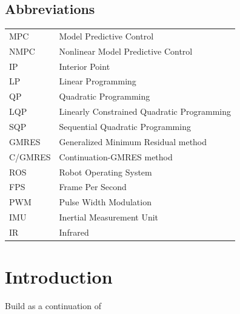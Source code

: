 \documentclass[a4paper, 12pt]{report}
\begin{document}
\subsection*{Abbreviations}
\begin{table}[h]
\centering
\begin{tabular}{p{8cm} p{8cm}}
MPC \dotfill & Model Predictive Control \\
NMPC \dotfill & Nonlinear Model Predictive Control \\
IP \dotfill & Interior Point \\
LP \dotfill & Linear Programming \\
QP \dotfill & Quadratic Programming \\
LQP \dotfill & Linearly Constrained Quadratic Programming \\
SQP \dotfill & Sequential Quadratic Programming \\
GMRES \dotfill & Generalized Minimum Residual method \\
C/GMRES \dotfill & Continuation-GMRES method \\
ROS \dotfill & Robot Operating System \\
FPS \dotfill	 & Frame Per Second \\
PWM \dotfill & Pulse Width Modulation \\
IMU \dotfill & Inertial Measurement Unit \\
IR \dotfill & Infrared \\
\end{tabular} 
\end{table}

\newpage
{}
\listoftables

\newpage
{}
\listoffigures

\newpage
\setlength{\parskip}{1.5em}
\setlength{\parindent}{1em}
\setcounter{page}{1}

\section{Introduction}
Build as a continuation of \cite{Suzuki2014}

\newpage
\end{document}
